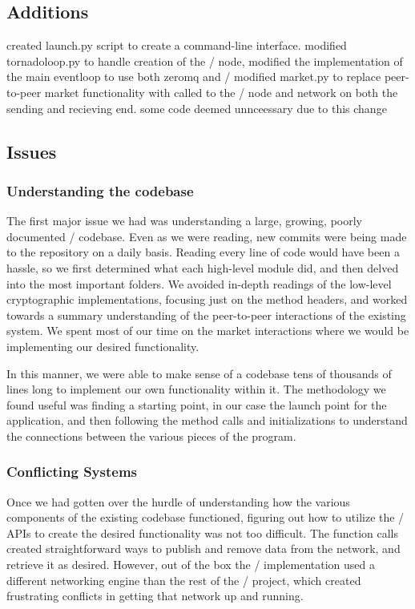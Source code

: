 \documentclass[11pt,twocolumn]{article}
\begin{document}
\subsection{Additions}
created launch.py script to create a command-line interface.
modified tornadoloop.py to handle creation of the \Entangled/ node, modified the implementation of the main eventloop to use both zeromq and \Entangled/
modified market.py to replace peer-to-peer market functionality with called to the \Entangled/ node and network on both the sending and recieving end. some code deemed unnceessary due to this change

\subsection{Issues}

\subsubsection{Understanding the codebase}
The first major issue we had was understanding a large, growing, poorly documented \OpenBazaar/ codebase.
Even as we were reading, new commits were being made to the repository on a daily basis.
Reading every line of code would have been a hassle, so we first determined what each high-level module did, and then delved into the most important folders.
We avoided in-depth readings of the low-level cryptographic implementations, focusing just on the method headers, and worked towards a summary understanding of the peer-to-peer interactions of the existing system.
We spent most of our time on the market interactions where we would be implementing our desired functionality.

In this manner, we were able to make sense of a codebase tens of thousands of lines long to implement our own functionality within it.
The methodology we found useful was finding a starting point, in our case the launch point for the application, and then following the method calls and initializations to understand the connections between the various pieces of the program.

\subsubsection{Conflicting Systems}
Once we had gotten over the hurdle of understanding how the various components of the existing codebase functioned, figuring out how to utilize the \Entangled/ APIs to create the desired functionality was not too difficult.
The function calls created straightforward ways to publish and remove data from the network, and retrieve it as desired.
However, out of the box the \Entangled/ implementation used a different networking engine than the rest of the \OpenBazaar/ project, which created frustrating conflicts in getting that network up and running.
\end{document}
